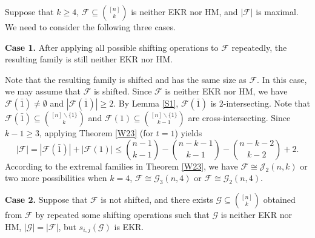 \documentclass[11pt]{article}
\numberwithin{equation}{section}
\newtheorem{prop}[theorem]{Proposition}
\begin{document}

Suppose that $k\geq 4$, $\mathcal{F}\subseteq\binom{[n]}{k}$ is neither EKR nor HM, and $|\mathcal{F}|$ is maximal. We need to consider the following three cases.

{\bf Case 1.} After applying all possible shifting operations to $\mathcal{F}$ repeatedly, the resulting family is still neither EKR nor HM. 

Note that the resulting family is shifted and has the same size as $\mathcal{F}$. 
In this case, we may assume that $\mathcal{F}$ is shifted. Since $\mathcal{F}$ is neither EKR nor HM, we have $\mathcal{F}(\bar{1})\neq \emptyset$ and $|\mathcal{F}(\bar{1})|\geq 2$.
By Lemma \ref{S1}, $\mathcal{F}(\bar{1})$ is 2-intersecting. Note that $\mathcal{F}(\bar{1}) \subseteq\binom{[n]\backslash \{1\}}{k}$ and $\mathcal{F}(1) \subseteq\binom{[n]\backslash \{1\}}{k-1}$ are  cross-intersecting. Since $k-1\geq 3$, applying Theorem \ref{W23} (for $t=1$) yields
$$
|\mathcal{F}|=|\mathcal{F}(\bar{1})|+|\mathcal{F}(1)| \leq\binom{n-1}{k-1}-\binom{n-k-1}{k-1}-\binom{n-k-2}{k-2}+2.
$$
According to the extremal families in Theorem \ref{W23}, we have
$\mathcal{F}\cong\mathcal{J}_2(n, k)$ or two more possibilities when $k=4$,  $\mathcal{F}\cong\mathcal{G}_3(n, 4)$ or $\mathcal{F}\cong\mathcal{G}_2(n, 4)$.


{\bf Case 2.}
 Suppose that $\mathcal{F}$ is not shifted, and there exists $\mathcal{G} \subseteq\binom{[n]}{k}$ obtained from $\mathcal{F}$ by repeated some shifting operations such that $\mathcal{G}$  is neither EKR nor HM, $|\mathcal{G}|=|\mathcal{F}|$, but
$s_{i, j}(\mathcal{G})$ is EKR.
\end{document}
